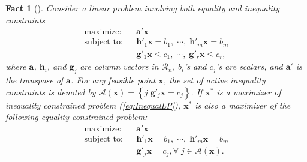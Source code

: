 \documentclass[12pt,onecolumn,draftclsnofoot]{IEEEtran} %
\newtheorem{fact}{Fact}
\begin{document}
\begin{fact}[\cite{Bertsekas99}]  \label{thm:EqualCont}
Consider a linear problem involving both equality and inequality constraints
\begin{eqnarray}
	\mbox{maximize:} && \mathbf{a}' \mathbf{x} \label{eq:InequalLP} \\
	\mbox{subject to:} && \mathbf{h}'_1\mathbf{x}=b_1, \; \cdots, \; 
        \mathbf{h}'_m\mathbf{x}=b_m   \nonumber \\
     && \mathbf{g}'_1\mathbf{x}\le c_1, \; \cdots, \; 
        \mathbf{g}'_r\mathbf{x} \le c_r, \nonumber
\end{eqnarray}
where $\mathbf{a}$, $\mathbf{h}_i$, and $\mathbf{g}_j$ are column vectors in $\mathcal{R}_n$, $b_i$'s and $c_j$'s are scalars, and $\mathbf{a}'$ is the {\em transpose} of $\mathbf{a}$. For any feasible point $\mathbf{x}$, the set of {\em active} inequality constraints is denoted by
  $\mathcal{A}(\mathbf{x}) = \left\{ j | \mathbf{g}'_j \mathbf{x}=c_j \right\}$.
If $\mathbf{x}^{\ast}$ is a maximizer of inequality constrained problem (\ref{eq:InequalLP}), $\mathbf{x}^{\ast}$ is also a maximizer of the following equality constrained problem:
\begin{eqnarray}
	\mbox{maximize:} && \mathbf{a}' \mathbf{x} \label{eq:eq:EqualLP} \\
	\mbox{subject to:} && \mathbf{h}'_1 \mathbf{x} = b_1, \; \cdots, \; 
  \mathbf{h}'_m \mathbf{x}=b_m \nonumber \\
  && \mathbf{g}'_j\mathbf{x} = c_j, \forall \; j \in \mathcal{A}(\mathbf{x}). \nonumber
\end{eqnarray} 
\end{fact}
\end{document}
